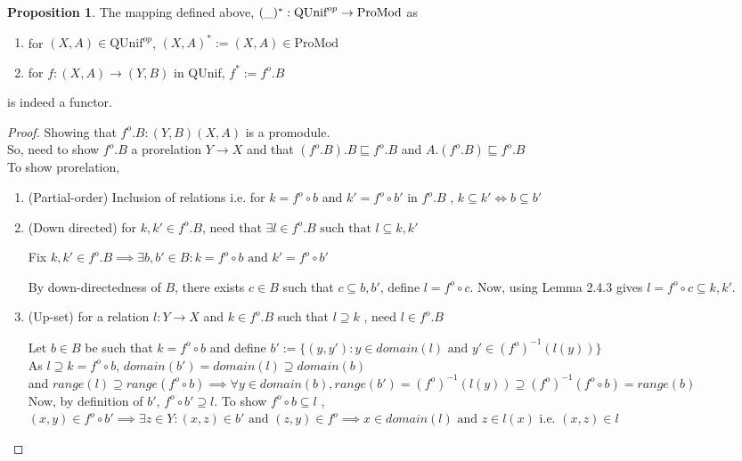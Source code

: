 \documentclass[18pt,a4paper]{article}
\makeatletter
\theoremstyle{definition}
\newtheorem{proop}[theorem]{Proposition}
\newcommand{\carrow}{}%
\DeclareRobustCommand{\carrow}{%
	\mathrel{\vphantom{\rightarrow}\mathpalette\circle@arrow\relax}%
}
\newcommand{\circle@arrow}[2]{%
	\m@th
	\ooalign{%
		\hidewidth$#1\circ\mkern1mu$\hidewidth\cr
	$#1\longrightarrow$\cr}%
}
\makeatother
\begin{document}
\begin{proop} The mapping defined above, $(\string _)^*:\text{QUnif}^{op} \to \text{ProMod}$ as
	\begin{enumerate}[label=(\alph*)]
		\item for $(X,A) \in \text{QUnif}^{op}$, $(X,A)^*:=(X,A) \in \text{ProMod}$
		\item for $f:(X,A) \to (Y,B)$ in QUnif,
			$f^* := f^o .B$
	\end{enumerate}
	is indeed a functor.
\end{proop}
\begin{proof}\setcounter{equation}{0}

	Showing that $f^o .B: (Y,B) \carrow (X,A)$ is a promodule.\\
	So, need to show $f^o .B$ a prorelation $Y \to X$
	and that $(f^o .B).B \sqsubseteq f^o .B$ and $A.(f^o .B) \sqsubseteq f^o .B$ \\
	To show prorelation, \begin{enumerate}[label=(\roman*)]
		\item (Partial-order) Inclusion of relations i.e. for $k=f^o \circ b$ and
			$k'=f^o \circ b'$ in $f^o .B$ , $k \subseteq k' \iff b \subseteq b'$
		\item (Down directed) for $k,k' \in f^o .B$, need that $\exists l \in f^o .B
			\text{ such that } l \subseteq k,k'$

			Fix $k,k' \in f^o .B \implies \exists b,b' \in B : k=f^o \circ b \text{ and }
			k' = f^o \circ b'$

			By down-directedness of $B$, there exists $c \in B$ such that
			$ c \subseteq b,b'$, define $l=f^o \circ c$.
			Now, using Lemma 2.4.3 gives  $l= f^o \circ c \subseteq k,k'$.
		\item (Up-set) for a relation $l:Y \to X$ and $k \in f^o .B$ such that $l \supseteq k$
			, need $l \in f^o .B$

			Let $b\in B$ be such that $k=f^o \circ b$ and define
			$b':=\{(y,y'): y \in domain(l) \text{ and } y' \in (f^o)^{-1}(l(y))\}$\\
			As $l\supseteq k=f^o \circ b$, $domain(b')=domain(l)\supseteq domain(b)$
			\\ and $range(l) \supseteq range(f^o \circ b)\implies
			\forall y \in domain(b), range (b')=(f^o )^{-1}(l(y)) \supseteq (f^o)^{-1}(f^o \circ b ) = range(b)$\\
			Now, by definition of $b'$, $f^o \circ b' \supseteq l$. To show
			$f^o \circ b \subseteq l$ , \\
			$(x,y)\in f^o \circ b' \implies \exists z \in Y: (x,z)\in b' \text{ and }
			(z,y) \in f^o \implies x \in domain(l) \text{ and } z \in l(x)$ i.e.
			$(x,z) \in l$


\end{enumerate}
\end{proof}
\end{document}
